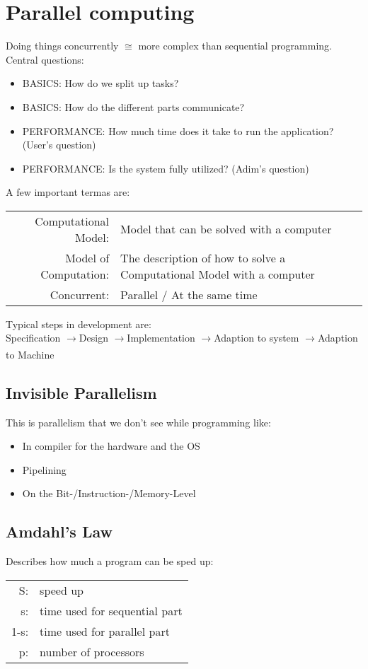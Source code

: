 \documentclass[a4paper]{article}
\newcommand\tab[1][1cm]{\hspace*{#1}}
\newcommand{\arrow}{$\xrightarrow[]{}$}
\begin{document}
\section{Parallel computing}
Doing things concurrently $\cong$ more complex than sequential programming. Central questions:
\begin{itemize}
\setlength{\itemsep}{-4pt}
\item BASICS: How do we split up tasks?
\item BASICS: How do the different parts communicate?
\item PERFORMANCE: How much time does it take to run the application? (User's question)
\item PERFORMANCE: Is the system fully utilized? (Adim's question)
\end{itemize}
A few important termas are:\\
\begin{tabular}{rl}
Computational Model:&Model that can be solved with a computer\\
Model of Computation:&The description of how to solve a Computational Model with a computer\\
Concurrent:&Parallel / At the same time\\
\end{tabular}
Typical steps in development are: \\
Specification \arrow Design \arrow Implementation \arrow Adaption to system \arrow Adaption to Machine

\subsection{Invisible Parallelism}
This is parallelism that we don't see while programming like:
\begin{itemize}
\setlength{\itemsep}{-4pt}
\item In compiler for the hardware and the OS
\item Pipelining
\item On the Bit-/Instruction-/Memory-Level
\end{itemize}

\subsection{Amdahl's Law}
Describes how much a program can be sped up:\\
\tab {\LARGE S=$\frac{1}{s+(1-s)/p}\geq\frac{1}{s}$\\}
\begin{tabular}{rl}
S:&speed up\\
s:&time used for sequential part\\
1-s:&time used for parallel part\\
p:&number of processors
\end{tabular}
\end{document}
